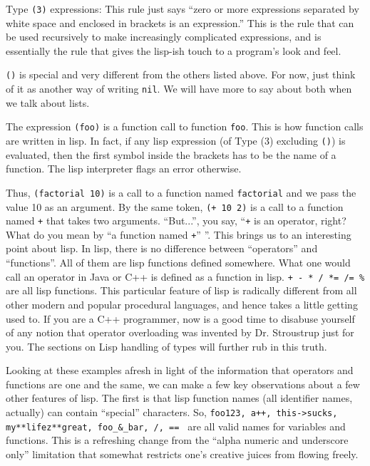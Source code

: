 \documentclass[10pt]{article}
\begin{document}
Type \texttt{(3)} expressions: This rule just says ``zero or more expressions
separated by white space and enclosed in brackets is an expression.'' This is
the rule that can be used recursively to make increasingly complicated
expressions, and is essentially the rule that gives the lisp-ish touch to a
program's look and feel.

\texttt{()} is special and very different from the others listed above.  For
now, just think of it as another way of writing \texttt{nil}.  We will have
more to say about both when we talk about lists.

The expression \texttt{(foo)} is a function call to function \texttt{foo}.
This is how function calls are written in lisp.  In fact, if any lisp
expression (of Type (3) excluding \texttt{()}) is evaluated, then the first
symbol inside the brackets has to be the name of a function.  The lisp
interpreter flags an error otherwise.

Thus, \texttt{(factorial 10)} is a call to a function named \texttt{factorial}
and we pass the value 10 as an argument.  By the same token, \texttt{(+ 10 2)}
is a call to a function named \texttt{+} that takes two arguments.  ``But...'',
you say, ``\texttt{+} is an operator, right?  What do you mean by ``a function
named \texttt{+}'' ''.  This brings us to an interesting point about lisp.  In
lisp, there is no difference between ``operators'' and ``functions''.  All of
them are lisp functions defined somewhere.  What one would call an operator in
Java or C++ is defined as a function in lisp.  \texttt{+ - * / *= /= \%} are
all lisp functions.  This particular feature of lisp is radically different
from all other modern and popular procedural languages, and hence takes a
little getting used to.  If you are a C++ programmer, now is a good time to
disabuse yourself of any notion that operator overloading was invented by
Dr. Stroustrup just for you.  The sections on Lisp handling of types will
further rub in this truth.

Looking at these examples afresh in light of the information that operators and
functions are one and the same, we can make a few key observations about a few
other features of lisp.  The first is that lisp function names (all identifier
names, actually) can contain ``special'' characters.  So, \texttt{foo123, a++,
this->sucks, my**lifez**great, foo\_\&\_bar, /, == } are all valid names for
variables and functions.  This is a refreshing change from the ``alpha numeric
and underscore only'' limitation that somewhat restricts one's creative juices
from flowing freely.
\end{document}
